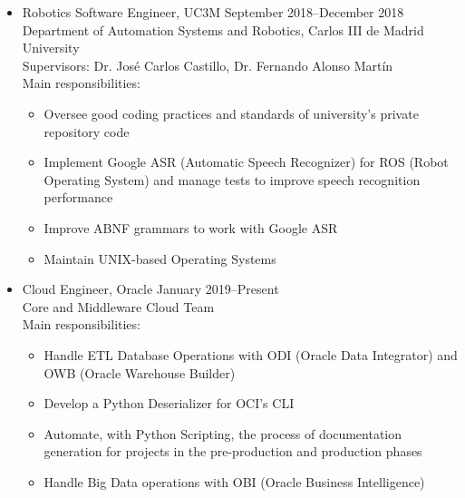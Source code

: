 \documentclass[11pt]{article}
\let\oldbibentry\bibentry
\renewcommand{\bibentry}[1]{\oldbibentry{#1}.}
\renewcommand{\section}[1]
{\vspace{1.0\baselineskip}{\Large\textbf{#1}}}
\begin{document}
\begin{itemize}[leftmargin=12pt]
  \item[] Robotics Software Engineer, UC3M \hfill September 2018--December 2018 \\
  Department of Automation Systems and Robotics, Carlos III de Madrid University \\
  Supervisors: Dr. José Carlos Castillo, Dr. Fernando Alonso Martín \\
  Main responsibilities:
  \begin{itemize}
      \item Oversee good coding practices and standards of university's private repository code
      \item Implement Google ASR (Automatic Speech Recognizer) for ROS (Robot Operating System) and manage tests to improve speech recognition performance
      \item Improve ABNF grammars to work with Google ASR
      \item Maintain UNIX-based Operating Systems
  \end{itemize}
  \item[] Cloud Engineer, Oracle \hfill January 2019--Present \\
  Core and Middleware Cloud Team \\
  Main responsibilities:
  \begin{itemize}
      \item Handle ETL Database Operations with ODI (Oracle Data Integrator) and OWB (Oracle Warehouse Builder)
      \item Develop a Python Deserializer for OCI's CLI 
      \item Automate, with Python Scripting, the process of documentation generation for projects in the pre-production and production phases
      \item Handle Big Data operations with OBI (Oracle Business Intelligence)
  \end{itemize}
\end{itemize}


\end{document}
